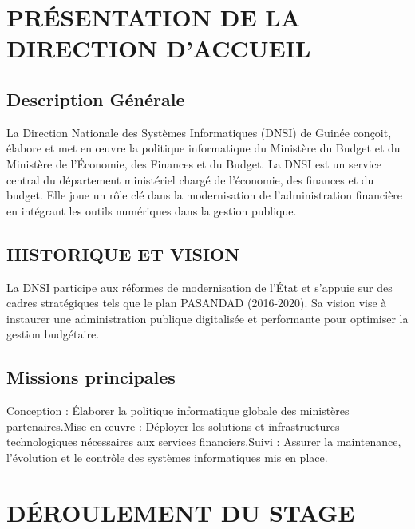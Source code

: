 \documentclass[12pt,a4paper]{article}
\begin{document}

\section{PRÉSENTATION DE LA DIRECTION D'ACCUEIL}

\subsection{Description Générale}

La Direction Nationale des Systèmes Informatiques (DNSI) de Guinée conçoit, élabore et met en œuvre la politique informatique du Ministère du Budget et du Ministère de l'Économie, des Finances et du Budget.
La DNSI est un service central du département ministériel chargé de l'économie, des finances et du budget. Elle joue un rôle clé dans la modernisation de l'administration financière en intégrant les outils numériques dans la gestion publique.

\subsection{HISTORIQUE ET VISION}

La DNSI participe aux réformes de modernisation de l'État et s'appuie sur des cadres stratégiques tels que le plan PASANDAD (2016-2020). Sa vision vise à instaurer une administration publique digitalisée et performante pour optimiser la gestion budgétaire.

\subsection{Missions principales}

Conception : Élaborer la politique informatique globale des ministères partenaires.Mise en œuvre : Déployer les solutions et infrastructures technologiques nécessaires aux services financiers.Suivi : Assurer la maintenance, l'évolution et le contrôle des systèmes informatiques mis en place.


\section{DÉROULEMENT DU STAGE}
\end{document}
